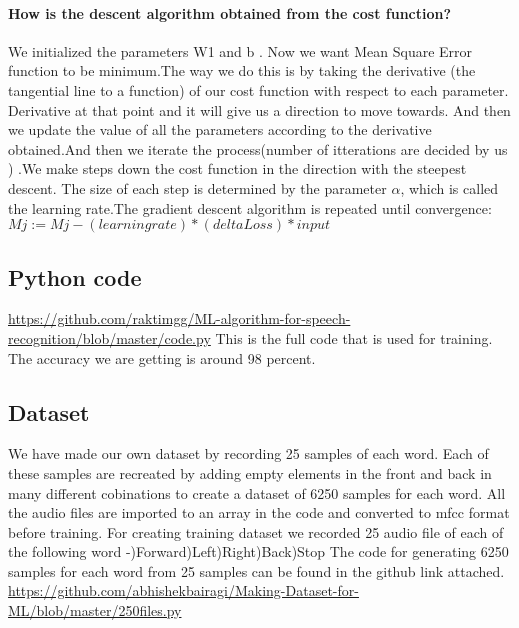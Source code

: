 \documentclass[journal,12pt,twocolumn]{IEEEtran}
\begin{document}
\paragraph{How is the descent algorithm obtained from the cost function?\newline}
We initialized the parameters W1 and b . Now we want Mean Square Error function to 
be minimum.The way we do this is by taking the derivative (the tangential line to a 
function) of our cost function with respect to each parameter. Derivative at that 
point and it will give us a direction to move towards. And then we update the value 
of all the parameters according to the derivative obtained.And then we iterate the 
process(number of itterations are decided by us ) .We make steps down the cost 
function in the direction with the steepest descent. The size of each step is 
determined by the parameter $\alpha$, which is called the learning rate.The gradient 
descent algorithm is repeated until convergence: 
$Mj :=Mj-(learningrate)*(delta Loss)*input$


\subsection{Python code}

\url{https://github.com/raktimgg/ML-algorithm-for-speech-recognition/blob/master/code.py}\newline
This is the full code that is used for training. The accuracy we are getting is around 98 percent.

\subsection{Dataset}
We have made our own dataset by recording 25 samples of each word. Each of these samples are recreated by adding empty elements in the front and back in many different cobinations to create a dataset of 6250 samples for each word. All the audio files are imported to an array in the code and converted to mfcc format before training. For creating training dataset we recorded 25 audio file of each of the following word -)Forward)Left)Right)Back)Stop\newline
The code for generating 6250 samples for each word from 25 samples can be found in the github link attached.\newline
\url{https://github.com/abhishekbairagi/Making-Dataset-for-ML/blob/master/250files.py}
\end{document}
